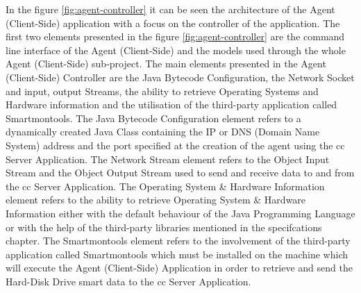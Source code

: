 In the figure \ref{fig:agent-controller} it can be seen the architecture of the Agent (Client-Side)
application with a focus on the controller of the application. The first two elements
presented in the figure \ref{fig:agent-controller} are the command line interface of the
Agent (Client-Side) and the models used through the whole Agent (Client-Side) sub-project.
The main elements presented in the Agent (Client-Side) Controller are the Java Bytecode
Configuration, the Network Socket and input, output Streams, the ability to retrieve
Operating Systems and Hardware information and the utilisation of the third-party
application called Smartmontools. The Java Bytecode Configuration element refers to
a dynamically created Java Class containing the IP or DNS (Domain Name System) address
and the port specified at the creation of the agent using the \acrfull{cc} Server
Application. The Network Stream element refers to the Object Input Stream and the Object
Output Stream used to send and receive data to and from the \acrfull{cc} Server
Application. The Operating System \& Hardware Information element refers to the ability
to retrieve Operating System \& Hardware Information either with the default behaviour
of the Java Programming Language or with the help of the third-party libraries mentioned
in the specifcations chapter. The Smartmontools element refers to the involvement of the
third-party application called Smartmontools which must be installed on the machine
which will execute the Agent (Client-Side) Application in order to retrieve and send
the Hard-Disk Drive \acrfull{smart} data to the \acrfull{cc} Server Application.
